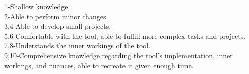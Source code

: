 \documentclass[A4]{deedy-resume} %
\begin{document}
\begin{minipage}[t]{0.33\textwidth}
\scriptsize 1-Shallow knowledge.\\
2-Able to perform minor changes.\\
3,4-Able to develop small projects.\\
5,6-Comfortable with the tool, able to fulfill more complex tasks and projects.\\
7,8-Understands the inner workings of the tool. \\
9,10-Comprehensive knowledge regarding the tool's implementation, inner workings, and nuances, able to recreate it given enough time.

\sectionspace %






\end{minipage} %
\hfill
%
%
\end{document}
